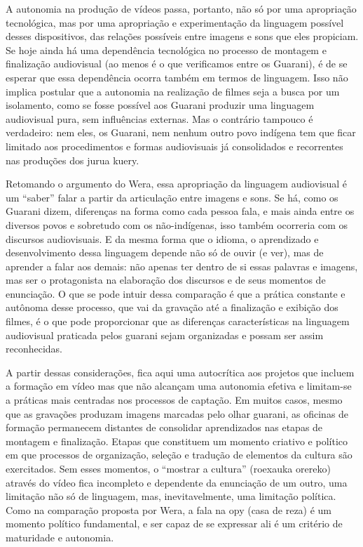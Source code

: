 {{A autonomia na produção de vídeos passa, portanto, não só por uma
apropriação tecnológica, mas por uma apropriação e experimentação da
linguagem possível desses dispositivos, das relações possíveis entre
imagens e sons que eles propiciam. Se hoje ainda há uma dependência
tecnológica no processo de montagem e finalização audiovisual (ao menos
é o que verificamos entre os Guarani), é de se esperar que essa
dependência ocorra também em termos de linguagem. Isso não implica
postular que a autonomia na realização de filmes seja a busca por um
isolamento, como se fosse possível aos Guarani produzir uma linguagem
audiovisual pura, sem influências externas. Mas o contrário tampouco é
verdadeiro: nem eles, os Guarani, nem nenhum outro povo indígena tem
que ficar limitado aos procedimentos e formas audiovisuais já
consolidados e recorrentes nas produções dos jurua kuery.

Retomando o argumento do Wera, essa apropriação da linguagem audiovisual
é um ``saber'' falar a partir da articulação
entre imagens e sons. Se há, como os Guarani dizem, diferenças na forma
como cada pessoa fala, e mais ainda entre os diversos povos e sobretudo
com os não-indígenas, isso também ocorreria com os discursos
audiovisuais. E da mesma forma que o idioma, o aprendizado e
desenvolvimento dessa linguagem depende não só de ouvir (e ver), mas de
aprender a falar aos demais: não apenas ter dentro de si essas palavras
e imagens, mas ser o protagonista na elaboração dos discursos e de seus
momentos de enunciação. O que se pode intuir dessa comparação é que a
prática constante e autônoma desse processo, que vai da gravação até a
finalização e exibição dos filmes, é o que pode proporcionar que as
diferenças características na linguagem audiovisual praticada pelos
guarani sejam organizadas e possam ser assim reconhecidas. 

A partir dessas considerações, fica aqui uma autocrítica aos projetos
que incluem a formação em vídeo mas que não alcançam uma autonomia
efetiva e limitam-se a práticas mais centradas nos processos de
captação. Em muitos casos, mesmo que as gravações produzam imagens
marcadas pelo olhar guarani, as oficinas de formação permanecem
distantes de consolidar aprendizados nas etapas de montagem e
finalização. Etapas que constituem um momento criativo e político em
que processos de organização, seleção e tradução de elementos da
cultura são exercitados. Sem esses momentos, o ``mostrar a cultura''
(roexauka orereko) através do vídeo fica incompleto e dependente da
enunciação de um outro, uma limitação não só de linguagem, mas,
inevitavelmente, uma limitação política. Como na comparação proposta
por Wera, a fala na opy (casa de reza) é um momento político
fundamental, e ser capaz de se expressar ali é um critério de
maturidade e autonomia.

}}
